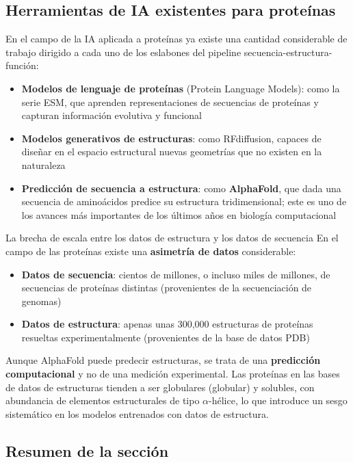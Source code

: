 \documentclass[a4paper]{article}
\begin{document}
\subsection{Herramientas de IA existentes para proteínas}

En el campo de la IA aplicada a proteínas ya existe una cantidad considerable de trabajo dirigido a cada uno de los eslabones del pipeline secuencia-estructura-función:

\begin{itemize}
    \item \textbf{Modelos de lenguaje de proteínas} (Protein Language Models): como la serie ESM, que aprenden representaciones de secuencias de proteínas y capturan información evolutiva y funcional
    \item \textbf{Modelos generativos de estructuras}: como RFdiffusion, capaces de diseñar en el espacio estructural nuevas geometrías que no existen en la naturaleza
    \item \textbf{Predicción de secuencia a estructura}: como \textbf{AlphaFold}, que dada una secuencia de aminoácidos predice su estructura tridimensional; este es uno de los avances más importantes de los últimos años en biología computacional
\end{itemize}

\begin{warningbox}{La brecha de escala entre los datos de estructura y los datos de secuencia}
En el campo de las proteínas existe una \textbf{asimetría de datos} considerable:
\begin{itemize}
    \item \textbf{Datos de secuencia}: cientos de millones, o incluso miles de millones, de secuencias de proteínas distintas (provenientes de la secuenciación de genomas)
    \item \textbf{Datos de estructura}: apenas unas 300,000 estructuras de proteínas resueltas experimentalmente (provenientes de la base de datos PDB)
\end{itemize}
Aunque AlphaFold puede predecir estructuras, se trata de una \textbf{predicción computacional} y no de una medición experimental. Las proteínas en las bases de datos de estructuras tienden a ser globulares (globular) y solubles, con abundancia de elementos estructurales de tipo $\alpha$-hélice, lo que introduce un sesgo sistemático en los modelos entrenados con datos de estructura.
\end{warningbox}

\subsection{Resumen de la sección}
\end{document}
